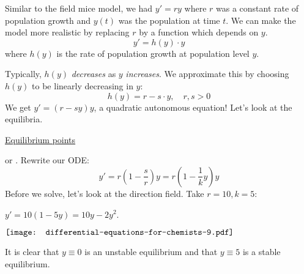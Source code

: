 \documentclass{article}
\newcommand{\tmcolor}[2]{{\color{#1}{#2}}}
\newcommand{\tmem}[1]{{\em #1\/}}
\begin{document}
Similar to the field mice model, we had $y' = ry$ where $r$ was a constant
rate of population growth and $y (t)$ was the population at time $t$. We can
make the model more realistic by replacing $r$ by a function which depends on
$y$.
\[ y' = h (y) \cdot y \]
where $h (y)$ is the rate of population growth at population level $y$.

Typically, $h (y)$ {\tmem{decreases}} as $y$ {\tmem{increases}}. We
approximate this by choosing $h (y)$ to be linearly decreasing in $y$:
\[ h (y) = r - s \cdot y, \quad r, s > 0 \]
We get $y' = (r - sy) y$, a quadratic autonomous equation! Let's look at the
equilibria.

{\underline{Equilibrium points}}

\tmcolor{blue}{$y = 0$} or \tmcolor{blue}{$y = \frac{r}{s} = k$}. Rewrite our
ODE:
\[ y' = r \left( 1 - \frac{s}{r} \right) y = r \left( 1 - \frac{1}{k} y
   \right) y \]
Before we solve, let's look at the direction field. Take $r = 10, k = 5$:

$y' = 10 (1 - 5 y) = 10 y - 2 y^2$.

$\raisebox{-0.00177331370681444\height}{\texttt{[image: differential-equations-for-chemists-9.pdf]}}$


It is clear that $y \equiv 0$ is an unstable equilibrium and that $y \equiv 5$
is a stable equilibrium.
\end{document}
